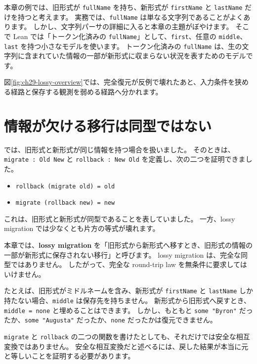本章の例では、旧形式が \texttt{fullName} を持ち、新形式が \texttt{firstName} と \texttt{lastName} だけを持つと考えます。
実務では、\texttt{fullName} は単なる文字列であることがよくあります。
しかし、文字列パーサの詳細に入ると本章の主題がぼやけます。
そこで Lean では「トークン化済みの \texttt{fullName}」として、\texttt{first}、任意の \texttt{middle}、\texttt{last} を持つ小さなモデルを使います。
トークン化済みの \texttt{fullName} は、生の文字列に含まれていた情報の一部が新形式に収まらない状況を表すためのモデルです。

図\ref{fig:ch29-lossy-overview}では、完全復元が反例で壊れたあと、入力条件を狭める経路と保存する観測を弱める経路へ分かれます。


\section{情報が欠ける移行は同型ではない}

では、旧形式と新形式が同じ情報を持つ場合を扱いました。
そのときは、\texttt{migrate : Old \textrightarrow New} と \texttt{rollback : New \textrightarrow Old} を定義し、次の二つを証明できました。

\begin{itemize}
\item \texttt{rollback (migrate old) = old}
\item \texttt{migrate (rollback new) = new}
\end{itemize}

これは、旧形式と新形式が同型であることを表していました。
一方、lossy migration では少なくとも片方の等式が壊れます。

本章では、\textbf{lossy migration} を「旧形式から新形式へ移すとき、旧形式の情報の一部が新形式に保存されない移行」と呼びます。
lossy migration は、完全な同型ではありません。
したがって、完全な round-trip law を無条件に要求してはいけません。

たとえば、旧形式がミドルネームを含み、新形式が \texttt{firstName} と \texttt{lastName} しか持たない場合、\texttt{middle} は保存先を持ちません。
新形式から旧形式へ戻すとき、\texttt{middle = none} と埋めることはできます。
しかし、もともと \texttt{some "Byron"} だったか、\texttt{some "Augusta"} だったか、\texttt{none} だったかは復元できません。

\texttt{migrate} と \texttt{rollback} の二つの関数を書けたとしても、それだけでは安全な相互変換ではありません。
安全な相互変換だと述べるには、戻した結果が本当に元と等しいことを証明する必要があります。

